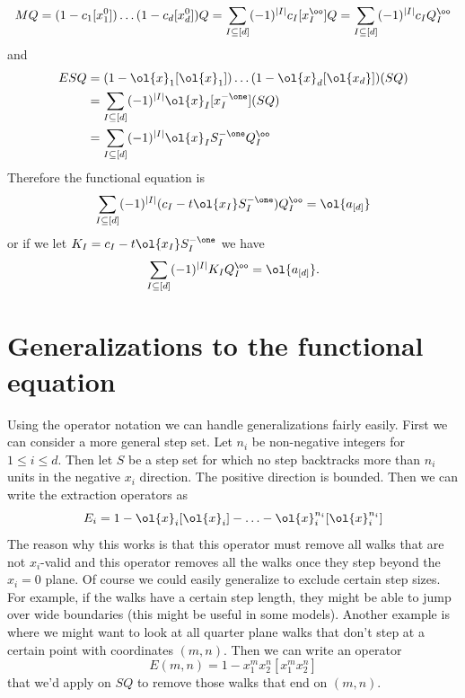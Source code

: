 \[
	M Q = (1-c_1[x_1^0])\ldots(1-c_d[x_d^0])Q = \sum_{I\subseteq [d]} (-1)^{|I|} c_I[x_I^\oo]Q =  \sum_{I\subseteq [d]} (-1)^{|I|} c_I Q_I^\oo
\]
and
\begin{align*}
	 ESQ &= (1-\ol{x}_1[\ol{x}_1])\ldots(1-\ol{x}_d[\ol{x_d}])(SQ) \\
	 &= \sum_{I\subseteq [d]} (-1)^{|I|} \ol{x}_I [x_I^{-\one}](SQ) \\
	 &= \sum_{I\subseteq [d]} (-1)^{|I|} \ol{x}_I S_I^{-\one}Q_I^\oo
\end{align*}
Therefore the functional equation is
\[
    \sum_{I \subseteq [d]}(-1)^{|I|}(c_I-t \ol{x_I}S_{I}^{-\one})Q_I^\oo = \ol{a_{[d]}}
\]
or if we let $K_I = c_I-t \ol{x_I}S_{I}^{-\one}$ we have
\[
   \sum_{I\subseteq [d]}(-1)^{|I|} K_I Q_I^\oo = \ol{a_{[d]}}.
\]
\section{Generalizations to the functional equation}
Using the operator notation we can handle generalizations fairly easily. First we can consider a more general step set. Let $n_i$ be non-negative integers for $1\leq i \leq d$. Then let $S$ be a step set for which no step backtracks more than $n_i$ units in the negative $x_i$ direction. The positive direction is bounded. Then we can write the extraction operators as
\[
E_ i =1-\ol{x}_i[\ol{x}_i]-\ldots -\ol{x}_i^{n_i}[\ol{x}_i^{n_i}]
\]
The reason why this works is that this operator must remove all walks that are not $x_i$-valid and this operator removes all the walks once they step beyond the $x_i = 0$ plane. Of course we could easily generalize to exclude certain step sizes. For example, if the walks have a certain step length, they might be able to jump over wide boundaries (this might be useful in some models). Another example is where we might want to look at all quarter plane walks that don't step at a certain point with coordinates $(m,n)$. Then we can write an operator
\[
   E(m,n)= 1- x_1^m x_2^n [x_1^m x_2^n]
\]
that we'd apply on $SQ$ to remove those walks that end on $(m,n)$.


